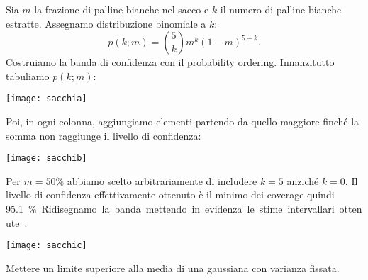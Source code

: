 

\begin{solution*}
	Sia $m$ la frazione di palline bianche nel sacco
	e $k$ il numero di palline bianche estratte.
	Assegnamo distribuzione binomiale a $k$:
	\begin{equation*}
		p(k;m)
		= \binom 5k m^k (1-m)^{5-k}.
	\end{equation*}
	Costruiamo la banda di confidenza con il probability ordering.
	Innanzitutto tabuliamo $p(k;m)$:
	\begin{center}
		\texttt{[image: sacchia]}
	\end{center}
	Poi, in ogni colonna,
	aggiungiamo elementi partendo da quello maggiore finché la somma non raggiunge
	il livello di confidenza:
	\begin{center}
		\texttt{[image: sacchib]}
	\end{center}
	Per $m=\SI{50}\%$ abbiamo scelto arbitrariamente di includere $k=5$ anziché $k=0$.
	Il livello di confidenza effettivamente ottenuto è il minimo dei coverage quindi \SI{95.1}\%.
	Ridisegnamo la banda mettendo in evidenza le stime intervallari ottenute:
	\begin{center}
		\texttt{[image: sacchic]}
	\end{center}
\end{solution*}

\begin{exercise}
	\label{th:gausssup}
	Mettere un limite superiore alla media di una gaussiana con varianza fissata.
\end{exercise}

